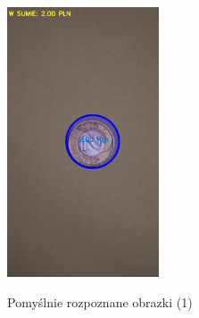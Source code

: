 \documentclass{mwart}
\begin{document}
\begin{figure}[ht!]
\begin{center}
{            \includegraphics[width=0.4\textwidth]{good_004.jpg}
        }
    \end{center}
    \caption{Pomyślnie rozpoznane obrazki (1)}
   \label{fig:subfigures}
\end{figure}
\end{document}
